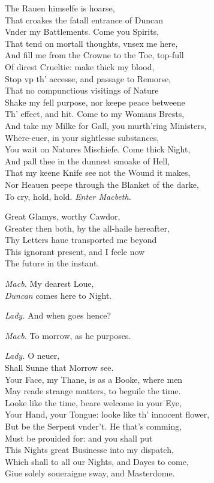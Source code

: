 \documentclass[12pt]{sides}
\newcommand{\dia}[1]{\hskip 15pt\textit{#1}\hskip 6pt}
\begin{document}
\begin{multicols}{2}
            The Rauen himselfe is hoarse, \\ That croakes the fatall entrance of Duncan \\ Vnder my Battlements. Come you Spirits, \\ That tend on mortall thoughts, vnsex me here, \\ And fill me from the Crowne to the Toe, top-full \\ Of direst Crueltie: make thick my blood, \\ Stop vp th' accesse, and passage to Remorse, \\ That no compunctious visitings of Nature \\ Shake my fell purpose, nor keepe peace betweene \\ Th' effect, and hit. Come to my Womans Brests, \\ And take my Milke for Gall, you murth'ring Ministers, \\ Where-euer, in your sightlesse substances, \\ You wait on Natures Mischiefe. Come thick Night, \\ And pall thee in the dunnest smoake of Hell, \\ That my keene Knife see not the Wound it makes, \\ Nor Heauen peepe through the Blanket of the darke, \\ To cry, hold, hold. \hfill \textit{Enter Macbeth.} \hspace{30pt} %

            Great Glamys, worthy Cawdor, \\ Greater then both, by the all-haile hereafter, \\ Thy Letters haue transported me beyond \\ This ignorant present, and I feele now \\ The future in the instant.

            \dia{Macb.} My dearest Loue, \\ \textit{Duncan} comes here to Night.

            \dia{Lady.} And when goes hence?

            \dia{Macb.} To morrow, as he purposes.

            \dia{Lady.} O neuer, \\ Shall Sunne that Morrow see. \\ Your Face, my Thane, is as a Booke, where men \\ May reade strange matters, to beguile the time. \\ Looke like the time, beare welcome in your Eye, \\ Your Hand, your Tongue: looke like th' innocent flower, \\ But be the Serpent vnder't. He that's comming, \\ Must be prouided for: and you shall put \\ This Nights great Businesse into my dispatch, \\ Which shall to all our Nights, and Dayes to come, \\ Giue solely soueraigne sway, and Masterdome.


\end{multicols}
\end{document}
